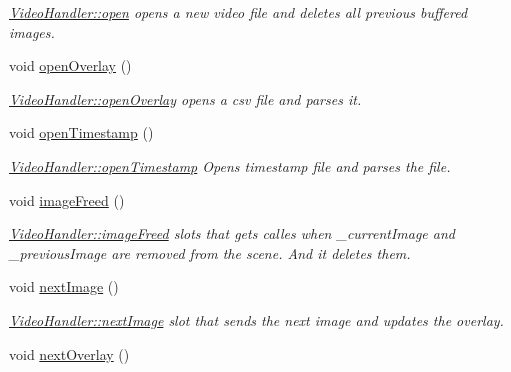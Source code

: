 \begin{DoxyCompactItemize}
\begin{DoxyCompactList}\small\item\em \hyperlink{classVideoHandler_aaa4f41896e565606552d960951145ca5}{Video\+Handler\+::open} opens a new video file and deletes all previous buffered images. \end{DoxyCompactList}\item 
void \hyperlink{classVideoHandler_a0ea54798e44864231a65bc1e9c3b502e}{open\+Overlay} ()\hypertarget{classVideoHandler_a0ea54798e44864231a65bc1e9c3b502e}{}\label{classVideoHandler_a0ea54798e44864231a65bc1e9c3b502e}

\begin{DoxyCompactList}\small\item\em \hyperlink{classVideoHandler_a0ea54798e44864231a65bc1e9c3b502e}{Video\+Handler\+::open\+Overlay} opens a csv file and parses it. \end{DoxyCompactList}\item 
void \hyperlink{classVideoHandler_a31fd29045a8a75b4daad184dd1ddb49e}{open\+Timestamp} ()\hypertarget{classVideoHandler_a31fd29045a8a75b4daad184dd1ddb49e}{}\label{classVideoHandler_a31fd29045a8a75b4daad184dd1ddb49e}

\begin{DoxyCompactList}\small\item\em \hyperlink{classVideoHandler_a31fd29045a8a75b4daad184dd1ddb49e}{Video\+Handler\+::open\+Timestamp} Opens timestamp file and parses the file. \end{DoxyCompactList}\item 
void \hyperlink{classVideoHandler_a19f870ae02d495c88c5ed52eba0abc9e}{image\+Freed} ()\hypertarget{classVideoHandler_a19f870ae02d495c88c5ed52eba0abc9e}{}\label{classVideoHandler_a19f870ae02d495c88c5ed52eba0abc9e}

\begin{DoxyCompactList}\small\item\em \hyperlink{classVideoHandler_a19f870ae02d495c88c5ed52eba0abc9e}{Video\+Handler\+::image\+Freed} slots that gets calles when \+\_\+current\+Image and \+\_\+previous\+Image are removed from the scene. And it deletes them. \end{DoxyCompactList}\item 
void \hyperlink{classVideoHandler_ac3aa37f13e2901e830c0070bbb8aad27}{next\+Image} ()\hypertarget{classVideoHandler_ac3aa37f13e2901e830c0070bbb8aad27}{}\label{classVideoHandler_ac3aa37f13e2901e830c0070bbb8aad27}

\begin{DoxyCompactList}\small\item\em \hyperlink{classVideoHandler_ac3aa37f13e2901e830c0070bbb8aad27}{Video\+Handler\+::next\+Image} slot that sends the next image and updates the overlay. \end{DoxyCompactList}\item 
void \hyperlink{classVideoHandler_a9740f6544f2695785ee84959719da200}{next\+Overlay} ()\hypertarget{classVideoHandler_a9740f6544f2695785ee84959719da200}{}\label{classVideoHandler_a9740f6544f2695785ee84959719da200}


\end{DoxyCompactItemize}
